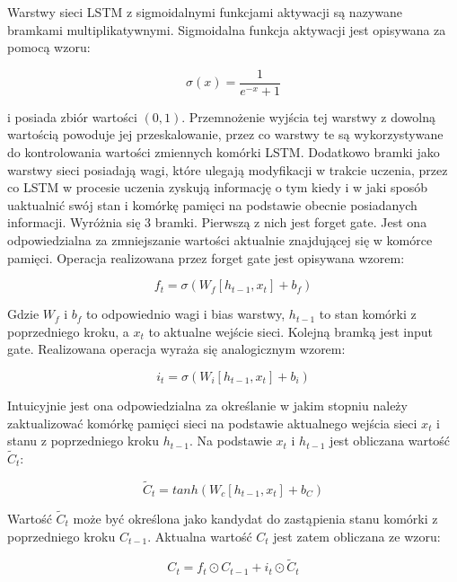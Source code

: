 \documentclass[oneside, mag]{mgr}
\begin{document}
Warstwy sieci LSTM z sigmoidalnymi funkcjami aktywacji są nazywane bramkami multiplikatywnymi. Sigmoidalna funkcja aktywacji jest opisywana za pomocą wzoru:

\begin{equation}
	\sigma(x) = \frac{1}{e^{-x} + 1}
\end{equation}

i posiada zbiór wartości $(0, 1)$. Przemnożenie wyjścia tej warstwy z dowolną wartością powoduje jej przeskalowanie, przez co warstwy te są wykorzystywane do kontrolowania wartości zmiennych komórki LSTM. Dodatkowo bramki jako warstwy sieci posiadają wagi, które ulegają modyfikacji w trakcie uczenia, przez co LSTM w procesie uczenia zyskują informację o tym kiedy i w jaki sposób uaktualnić swój stan i komórkę pamięci na podstawie obecnie posiadanych informacji. Wyróżnia się 3 bramki. Pierwszą z nich jest forget gate. Jest ona odpowiedzialna za zmniejszanie wartości aktualnie znajdującej się w komórce pamięci. Operacja realizowana przez forget gate jest opisywana wzorem: 

\begin{equation}
	f_t = \sigma( W_f [ h_{t-1}, x_t ] + b_f )
\end{equation}

Gdzie $W_f$ i $b_f$ to odpowiednio wagi i bias warstwy, $h_{t-1}$ to stan komórki z poprzedniego kroku, a $x_t$ to aktualne wejście sieci. Kolejną bramką jest input gate. Realizowana operacja wyraża się analogicznym wzorem:

\begin{equation}
	i_t = \sigma( W_i [ h_{t-1}, x_t ] + b_i )
\end{equation}

Intuicyjnie jest ona odpowiedzialna za określanie w jakim stopniu należy zaktualizować komórkę pamięci sieci na podstawie aktualnego wejścia sieci $x_t$ i stanu z poprzedniego kroku $h_{t-1}$. Na podstawie $x_t$ i $h_{t-1}$ jest obliczana wartość $\tilde{C}_t$:

\begin{equation}
	\tilde{C}_t = tanh( W_c [ h_{t-1}, x_t ] + b_C )
\end{equation}

Wartość $\tilde{C}_t$ może być określona jako kandydat do zastąpienia stanu komórki z poprzedniego kroku $C_{t-1}$. Aktualna wartość $C_t$ jest zatem obliczana ze wzoru:

\begin{equation}
	C_t = f_t \odot C_{t-1} + i_t \odot \tilde{C}_t
\end{equation}
\end{document}
